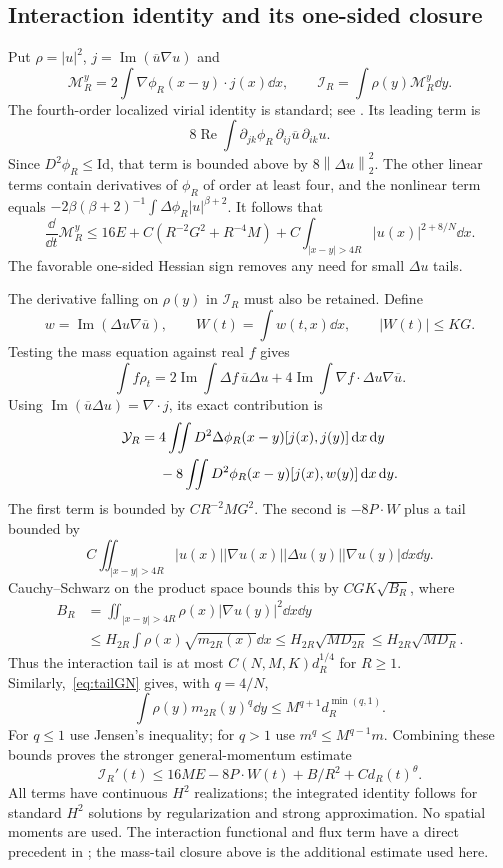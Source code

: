 \documentclass[11pt,a4paper]{article}
\theoremstyle{remark}\newtheorem{remark}[theorem]{Remark}
\newcommand{\norm}[1]{\left\|#1\right\|}
\newcommand{\Imn}{\operatorname{Im}}\newcommand{\Ren}{\operatorname{Re}}
\begin{document}
\subsection{Interaction identity and its one-sided closure}
Put $\rho=|u|^2$, $j=\Imn(\overline u\nabla u)$ and
\[
 \mathcal M_R^y=2\int\nabla\phi_R(x-y)\cdot j(x)\dd x,
 \qquad \mathcal I_R=\int\rho(y)\mathcal M_R^y\dd y.
\]
The fourth-order localized virial identity is standard; see \cite{BL}. Its leading term is
\[8\Ren\int\partial_{jk}\phi_R\,\partial_{ij}\overline u\,\partial_{ik}u.\]
Since $D^2\phi_R\le\mathrm{Id}$, that term is bounded above by $8\norm{\Delta u}_2^2$. The other linear terms contain derivatives of $\phi_R$ of order at least four, and the nonlinear term equals
$-2\beta(\beta+2)^{-1}\int\Delta\phi_R|u|^{\beta+2}$.
It follows that
\begin{equation}\label{eq:singlevir}
 \frac{\dd}{\dd t}\mathcal M_R^y
 \le16E+C(R^{-2}G^2+R^{-4}M)
 +C\int_{|x-y|>4R}|u(x)|^{2+8/N}\dd x.
\end{equation}
The favorable one-sided Hessian sign removes any need for small $\Delta u$ tails.

The derivative falling on $\rho(y)$ in $\mathcal I_R$ must also be retained. Define
\[
 w=\Imn(\Delta u\nabla\overline u),\qquad W(t)=\int w(t,x)\dd x,
 \qquad |W(t)|\le KG.
\]
Testing the mass equation against real $f$ gives
\[
 \int f\rho_t=2\Imn\int\Delta f\,\overline u\Delta u
 +4\Imn\int\nabla f\cdot\Delta u\nabla\overline u.
\]
Using $\Imn(\overline u\Delta u)=\nabla\cdot j$, its exact contribution is
\begin{align}\label{eq:Y}
 \mathcal Y_R={}&4\iint D^2\Delta\phi_R(x-y)[j(x),j(y)]\,\mathrm d x\,\mathrm d y\notag\\
 &-8\iint D^2\phi_R(x-y)[j(x),w(y)]\,\mathrm d x\,\mathrm d y.
\end{align}
The first term is bounded by $CR^{-2}MG^2$. The second is $-8P\cdot W$ plus a tail bounded by
\[
 C\iint_{|x-y|>4R}|u(x)||\nabla u(x)||\Delta u(y)||\nabla u(y)|\dd x\dd y.
\]
Cauchy--Schwarz on the product space bounds this by $CGK\sqrt{B_R}$, where
\begin{align*}
 B_R&=\iint_{|x-y|>4R}\rho(x)|\nabla u(y)|^2\dd x\dd y\\
 &\le H_{2R}\int\rho(x)\sqrt{m_{2R}(x)}\dd x
 \le H_{2R}\sqrt{MD_{2R}}\le H_{2R}\sqrt{MD_R}.
\end{align*}
Thus the interaction tail is at most $C(N,M,K)d_R^{1/4}$ for $R\ge1$.
Similarly,~\eqref{eq:tailGN} gives, with $q=4/N$,
\[
 \int\rho(y)m_{2R}(y)^q\dd y
 \le M^{q+1}d_R^{\min(q,1)}.
\]
For $q\le1$ use Jensen's inequality; for $q>1$ use $m^q\le M^{q-1}m$.
Combining these bounds proves the stronger general-momentum estimate
\begin{equation}\label{eq:interaction}
 \mathcal I_R'(t)\le16ME-8P\cdot W(t)+B/R^2+Cd_R(t)^\theta.
\end{equation}
All terms have continuous $H^2$ realizations; the integrated identity follows for standard $H^2$ solutions by regularization and strong approximation. No spatial moments are used. The interaction functional and flux term have a direct precedent in \cite[Section 5]{Komada}; the mass-tail closure above is the additional estimate used here.
\end{document}
